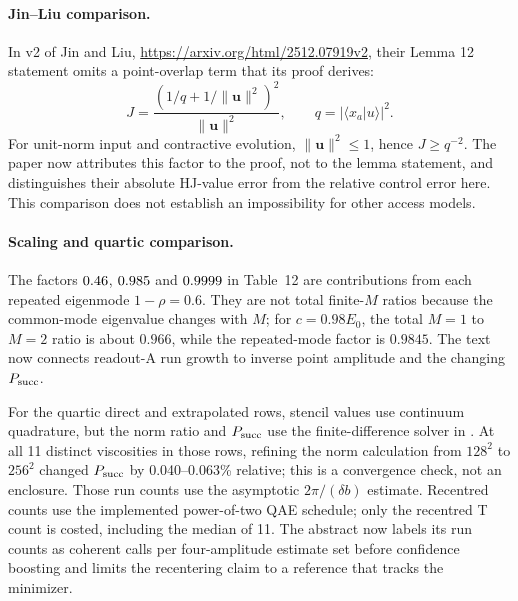 \documentclass[11pt,a4paper]{article}
\begin{document}
\paragraph{Jin--Liu comparison.}
In v2 of Jin and Liu, \url{https://arxiv.org/html/2512.07919v2}, their Lemma 12 statement omits a point-overlap term that its proof derives:
\[
 J=\frac{(1/q+1/\|\mathbf u\|^2)^2}{\|\mathbf u\|^2},\qquad
 q=|\langle x_a|u\rangle|^2.
\]
For unit-norm input and contractive evolution, $\|\mathbf u\|^2\le1$, hence $J\ge q^{-2}$.
The paper now attributes this factor to the proof, not to the lemma statement, and distinguishes their absolute HJ-value error from
the relative control error here. This comparison does not establish an impossibility for other access models.

\paragraph{Scaling and quartic comparison.}
The factors $0.46$, $0.985$ and $0.9999$ in Table~12 are contributions from each repeated eigenmode
$1-\rho=0.6$. They are not total finite-$M$ ratios because the common-mode eigenvalue changes with $M$; for $c=0.98E_0$,
the total $M=1$ to $M=2$ ratio is about $0.966$, while the repeated-mode factor is $0.9845$. The text now connects readout-A
run growth to inverse point amplitude and the changing $P_{\rm succ}$.

For the quartic direct and extrapolated rows, stencil values use continuum quadrature, but the norm ratio and $P_{\rm succ}$ use
the finite-difference solver in . At all 11 distinct viscosities in those rows, refining the norm
calculation from $128^2$ to $256^2$ changed $P_{\rm succ}$ by 0.040--0.063\% relative; this is a convergence check, not an enclosure.
Those run counts use the asymptotic $2\pi/(\delta b)$ estimate. Recentred counts use the implemented power-of-two QAE schedule;
only the recentred T count is costed, including the median of 11. The abstract now labels its run counts as coherent calls per
four-amplitude estimate set before confidence boosting and limits the recentering claim to a reference that tracks the minimizer.
\end{document}
